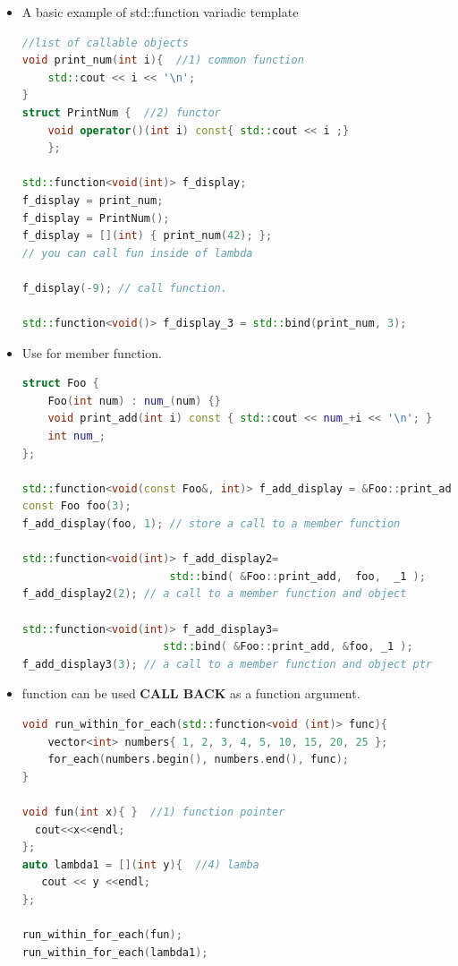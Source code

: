 \documentclass[a4paper,12pt,twoside]{book}
\begin{document}
\begin{itemize}
\item A basic example of std::function variadic template
\begin{lstlisting}[frame=single, language=c++]
//list of callable objects
void print_num(int i){  //1) common function
    std::cout << i << '\n';
}
struct PrintNum {  //2) functor
    void operator()(int i) const{ std::cout << i ;}
    };

std::function<void(int)> f_display;
f_display = print_num;
f_display = PrintNum();
f_display = [](int) { print_num(42); };
// you can call fun inside of lambda

f_display(-9); // call function.

std::function<void()> f_display_3 = std::bind(print_num, 3);
\end{lstlisting}

\item Use for member function.

\begin{lstlisting}[frame=single, language=c++]
struct Foo {
    Foo(int num) : num_(num) {}
    void print_add(int i) const { std::cout << num_+i << '\n'; }
    int num_;
};

std::function<void(const Foo&, int)> f_add_display = &Foo::print_add;
const Foo foo(3);
f_add_display(foo, 1); // store a call to a member function

std::function<void(int)> f_add_display2=
                       std::bind( &Foo::print_add,  foo,  _1 );
f_add_display2(2); // a call to a member function and object

std::function<void(int)> f_add_display3=
                      std::bind( &Foo::print_add, &foo, _1 );
f_add_display3(3); // a call to a member function and object ptr
\end{lstlisting}

\item function can be used \textbf{CALL BACK} as a function argument.

\begin{lstlisting}[frame=single, language=c++]
void run_within_for_each(std::function<void (int)> func){
    vector<int> numbers{ 1, 2, 3, 4, 5, 10, 15, 20, 25 };
    for_each(numbers.begin(), numbers.end(), func);
}

void fun(int x){ }  //1) function pointer
  cout<<x<<endl;
};
auto lambda1 = [](int y){  //4) lamba
   cout << y <<endl;
};

run_within_for_each(fun);
run_within_for_each(lambda1);
\end{lstlisting}



\end{itemize}
\end{document}
